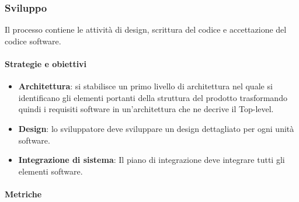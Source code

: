             \hphantom{}
            \def\productquality{
            {   Budget at Completion [BG],
                numero intero, 
                $ \pm 5 \% $ del preventivo,
                pari al preventivo
            },
            {   Earned value [EV],
                BAC - $\%$ di lavoro completato, 
                $ >0$,
                $ >0$
            },
            {   Planned value [PV],
                valore pianificato nel momento del calcolo, 
                $ >0$,
                $ >0$
            },
            {  Acual cost [AC],
               numero intero, 
                0 < AC $\leq$ budget totale,
                0 < AC $\leq$ PV
            },
            {   Schedule variance [SV],
               SV = EV - PV, 
                $ >0$,
                $ 0$
            },
            {    Cost variance [CV],
               CV = EV - AC, 
                $ >0$,
                $ \geq 0$
            },
        }
        

    \newpage  
    
    \subsubsection{Sviluppo}
    Il processo contiene le attività di design, scrittura del codice e accettazione del codice software.
    
        \paragraph{Strategie e obiettivi}
        \begin{itemize}
            \item \textbf{Architettura}: si stabilisce un primo livello di architettura nel quale si identificano gli elementi portanti della struttura del prodotto trasformando quindi i requisiti software in un'architettura che ne decrive il Top-level.
            \item \textbf{Design}: lo sviluppatore deve sviluppare un design dettagliato per ogni unità software.
            \item \textbf{Integrazione di sistema}: Il piano di integrazione deve integrare tutti gli elementi software.
        \end{itemize}
        
        \paragraph{Metriche}
        \phantom{} \\
        
